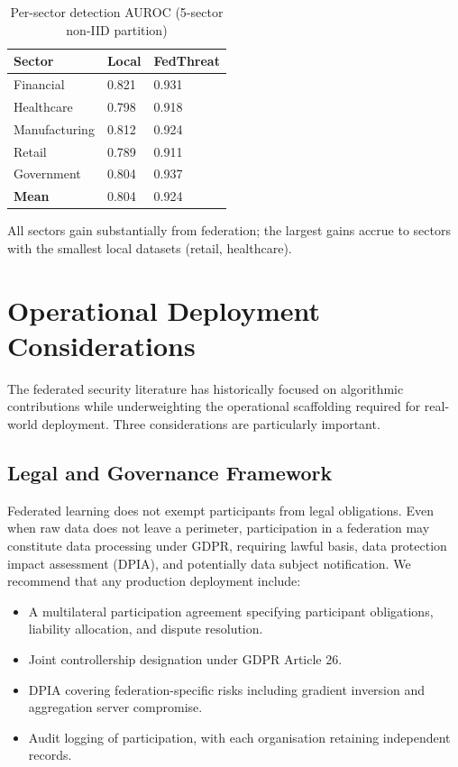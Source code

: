 \documentclass[sigconf,nonacm]{acmart}
\begin{document}
\begin{table}[h]
\caption{Per-sector detection AUROC (5-sector non-IID partition)}
\label{tab:sectors}
\small
\begin{tabularx}{\columnwidth}{@{}p{2.5cm}*{2}{X}@{}}
\toprule
\textbf{Sector} & \textbf{Local} & \textbf{FedThreat} \\
\midrule
Financial      & 0.821 & 0.931 \\
Healthcare     & 0.798 & 0.918 \\
Manufacturing  & 0.812 & 0.924 \\
Retail         & 0.789 & 0.911 \\
Government     & 0.804 & 0.937 \\
\midrule
\textbf{Mean}  & 0.804 & 0.924 \\
\bottomrule
\end{tabularx}
\end{table}

All sectors gain substantially from federation; the largest gains accrue
to sectors with the smallest local datasets (retail, healthcare).

\section{Operational Deployment Considerations}

The federated security literature has historically focused on algorithmic
contributions while underweighting the operational scaffolding required for
real-world deployment. Three considerations are particularly important.

\subsection{Legal and Governance Framework}

Federated learning does not exempt participants from legal obligations.
Even when raw data does not leave a perimeter, participation in a
federation may constitute data processing under GDPR, requiring lawful
basis, data protection impact assessment (DPIA), and potentially data
subject notification. We recommend that any production deployment include:

\begin{itemize}
  \item A multilateral participation agreement specifying participant
        obligations, liability allocation, and dispute resolution.
  \item Joint controllership designation under GDPR Article 26.
  \item DPIA covering federation-specific risks including gradient
        inversion and aggregation server compromise.
  \item Audit logging of participation, with each organisation retaining
        independent records.
\end{itemize}
\end{document}
